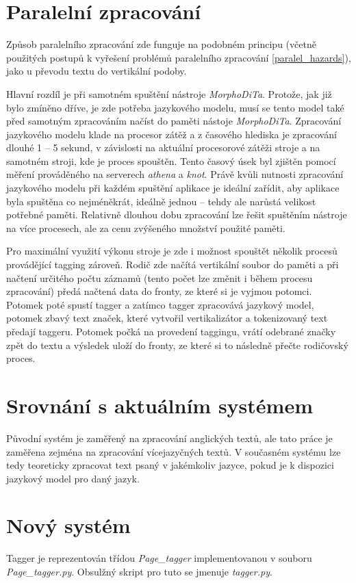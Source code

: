 \section{Paralelní zpracování}
Způsob paralelního zpracování zde funguje na podobném principu (včetně použitých postupů k vyřešení problémů
paralelního zpracování \ref{paralel_hazards}), jako u převodu textu do vertikální podoby.

Hlavní rozdíl je při samotném spuštění nástroje \textit{MorphoDiTa}. Protože, jak již bylo zmíněno dříve, je zde potřeba
jazykového modelu, musí se tento model také před samotným zpracováním načíst do paměti nástoje \textit{MorphoDiTa}.
Zpracování jazykového modelu klade na procesor zátěž a z časového hlediska je zpracování dlouhé 1 -- 5 sekund, v závislosti
na aktuální procesorové zátěži stroje a na samotném stroji, kde je proces spouštěn. Tento časový úsek
byl zjištěn pomocí měření prováděného na serverech \textit{athena} a \textit{knot}. Právě kvůli nutnosti
zpracování jazykového modelu při každém spuštění aplikace je ideální zařídit, aby aplikace
byla spuštěna co nejméněkrát, ideálně jednou -- tehdy ale narůstá velikost potřebné paměti. Relativně dlouhou dobu zpracování
lze řešit spuštěním nástroje na více procesech, ale za cenu zvýšeného množství použité paměti.

Pro maximální využití výkonu stroje je zde i možnost spouštět několik procesů provádějící tagging zároveň.
Rodič zde načítá vertikální soubor do paměti a při načtení určitého počtu záznamů (tento počet lze změnit i během procesu zpracování) předá načtená data
do fronty, ze které si je vyjmou potomci. Potomek poté spustí tagger a zatímco tagger zpracovává jazykový model,
potomek zbavý text značek, které vytvořil vertikalizátor a tokenizovaný text předají taggeru. Potomek počká
na provedení taggingu, vrátí odebrané značky zpět do textu a výsledek uloží do fronty, ze které si to následně
přečte rodičovský proces.

\section{Srovnání s aktuálním systémem}
Původní systém je zaměřený na zpracování anglických textů, ale tato práce je zaměřena
zejména na zpracování vícejazyčných textů. V současném systému lze tedy teoreticky
zpracovat text psaný v jakémkoliv jazyce, pokud je k dispozici jazykový model
pro daný jazyk.

\section{Nový systém}
Tagger je reprezentován třídou \textit{Page\_tagger} implementovanou v souboru \textit{Page\_tagger.py}. Obsulžný skript pro tuto
se jmenuje \textit{tagger.py}.

